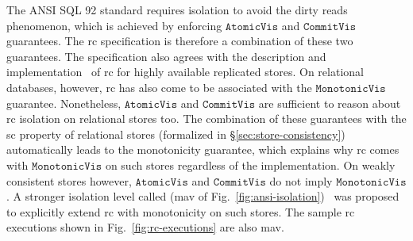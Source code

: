 The ANSI SQL 92 standard requires  isolation to avoid
the dirty reads phenomenon, which is achieved by enforcing
$\mathtt{AtomicVis}$ and $\mathtt{CommitVis}$ guarantees. The {\sc rc}
specification is therefore a combination of these two guarantees. The
specification also agrees with the description and
implementation~\cite{bailishat,pldi15} of {\sc rc} for highly
available replicated stores. On relational databases, however, {\sc
rc} has also come to be associated with the $\mathtt{MonotonicVis}$
guarantee.  Nonetheless, $\mathtt{AtomicVis}$ and $\mathtt{CommitVis}$
are sufficient to reason about {\sc rc} isolation on relational stores
too. The combination of these guarantees with the {\sc sc} property of
relational stores (formalized in \S\ref{sec:store-consistency})
automatically leads to the monotonicity guarantee, which explains why
{\sc rc} comes with $\mathtt{MonotonicVis}$ on such stores regardless
of the implementation. On weakly consistent stores however,
$\mathtt{AtomicVis}$ and $\mathtt{CommitVis}$ do not imply
$\mathtt{MonotonicVis}$. A stronger isolation level called
 ({\sc mav} of
Fig.~\ref{fig:ansi-isolation})~\cite{bailishat,pldi15} was proposed to
explicitly extend {\sc rc} with monotonicity on such stores. The sample
{\sc rc} executions shown in Fig.~\ref{fig:rc-executions} are also
{\sc mav}.

